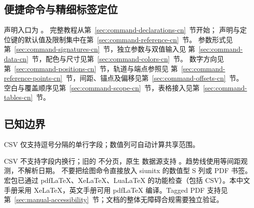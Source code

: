 \subsection{便捷命令与精细标签定位}
声明入口为 。
完整教程从第~\ref{sec:command-declarations-cn}~节开始；
声明与定位键的默认值及限制集中在第~\ref{sec:command-reference-cn}~节。
参数形式见第~\ref{sec:command-signatures-cn}~节，独立参数与双值输入见
第~\ref{sec:command-data-cn}~节，配色与尺寸见第~\ref{sec:command-colors-cn}~节。
数字方向见第~\ref{sec:command-positions-cn}~节，轨道与端点参照见
第~\ref{sec:command-reference-points-cn}~节，间距、锚点及偏移见第~\ref{sec:command-offsets-cn}~节。
空白与覆盖顺序见第~\ref{sec:command-scope-cn}~节，表格接入见第~\ref{sec:command-tables-cn}~节。

\subsection{已知边界}
CSV 仅支持逗号分隔的单行字段；数值列可自动计算共享范围。

CSV 不支持字段内换行；旧的  不分页，原生  数据源支持 。趋势线使用等间距观测，不解析日期。
不要把绘图命令直接放入 siunitx 的数值型 S 列或 PDF 书签。
宏包已通过 pdfLaTeX、XeLaTeX、LuaLaTeX 的功能检查（包括 CSV）。本中文手册采用 XeLaTeX，英文手册可用 pdfLaTeX 编译。Tagged PDF 支持见第~\ref{sec:manual-accessibility}~节；文档的整体无障碍合规需要独立验证。
